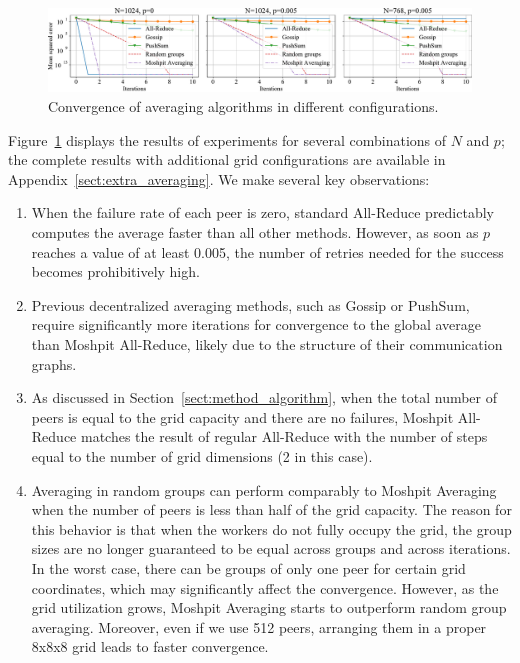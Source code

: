 \vspace{-4pt}
\begin{figure}[h]
\noindent
\centering
\includegraphics[width=\textwidth]{resources/averaging.pdf}
\caption{Convergence of averaging algorithms in different configurations.}
\label{fig:averaging}
\end{figure}
\vspace{-8pt}

Figure~\ref{fig:averaging} displays the results of experiments for several combinations of $N$ and $p$; the complete results with additional grid configurations are available in Appendix~\ref{sect:extra_averaging}. We make several key observations: 
\begin{enumerate}[leftmargin=*]
    \vspace{-2pt}\item When the failure rate of each peer is zero, standard All-Reduce predictably computes the average faster than all other methods. However, as soon as $p$ reaches a value of at least 0.005, the number of retries needed for the success becomes prohibitively high.
    \vspace{-2pt}\item Previous decentralized averaging methods, such as Gossip or PushSum, require significantly more iterations for convergence to the global average than Moshpit All-Reduce, likely due to the structure of their communication graphs.
    \vspace{-2pt}\item As discussed in Section~\ref{sect:method_algorithm}, when the total number of peers is equal to the grid capacity and there are no failures, Moshpit All-Reduce matches the result of regular All-Reduce with the number of steps equal to the number of grid dimensions (2 in this case).
    \vspace{-2pt}\item Averaging in random groups can perform comparably to Moshpit Averaging when the number of peers is less than half of the grid capacity. The reason for this behavior is that when the workers do not fully occupy the grid, the group sizes are no longer guaranteed to be equal across groups and across iterations. In the worst case, there can be groups of only one peer for certain grid coordinates, which may significantly affect the convergence. However, as the grid utilization grows, Moshpit Averaging starts to outperform random group averaging. Moreover, even if we use 512 peers, arranging them in a proper 8x8x8 grid leads to faster convergence.
\end{enumerate}

